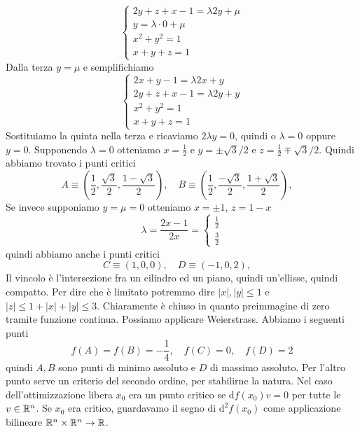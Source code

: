 \documentclass[a4paper]{article}
\begin{document}
\begin{snippetexercise}{}
\[\begin{cases}
            2y + z + x - 1 = \lambda 2y + \mu \\
            y = \lambda \cdot 0 + \mu \\
            x^2 + y^2 = 1 \\
            x + y + z = 1
        \end{cases}
    \]
    Dalla terza \(y=\mu\) e semplifichiamo
    \[
        \begin{cases}
            2x + y - 1 = \lambda 2x + y \\
            2y + z + x - 1 = \lambda 2y + y \\
            x^2 + y^2 = 1 \\
            x + y + z = 1
        \end{cases}
    \]
    Sostituiamo la quinta nella terza e ricaviamo \(2\lambda y = 0\),
    quindi o \(\lambda = 0\) oppure \(y = 0\). Supponendo \(\lambda = 0\)
    otteniamo \(x=\frac12\) e \(y = \pm \sqrt{3} /2\) e \(z = \frac12 \mp \sqrt{3} / 2\).
    Quindi abbiamo trovato i punti critici
    \[
        A \equiv \left(\frac12, \frac{\sqrt{3}}{2}, \frac{1 - \sqrt{3}}{2}\right), \quad
        B \equiv \left(\frac12, \frac{-\sqrt{3}}{2}, \frac{1 + \sqrt{3}}{2}\right), \quad
    \]
    Se invece supponiamo \(y=\mu = 0\) otteniamo \(x = \pm 1\),
    \(z = 1 - x\)
    \[
        \lambda = \frac{2x - 1}{2x} = \begin{cases}
            \frac12  \\
            \frac32
        \end{cases}
    \]
    quindi abbiamo anche i punti critici
     \[
        C \equiv \left(1, 0, 0\right), \quad
        D \equiv \left(-1, 0, 2\right), \quad
    \]
    Il vincolo è l'intersezione fra un cilindro ed un piano, quindi un'ellisse,
    quindi compatto. Per dire che è limitato potremmo dire \(|x|, |y| \leq 1\)
    e \(|z| \leq 1 + |x| + |y| \leq 3\). Chiaramente è chiuso
    in quanto preimmagine di zero tramite funzione continua.
    Possiamo applicare Weierstrass. Abbiamo i seguenti punti
    \[
        f(A) = f(B) = -\frac14, \quad f(C) = 0, \quad f(D) = 2
    \]
    quindi \(A,B\) sono punti di minimo assoluto e \(D\) di massimo assoluto.
    Per l'altro punto serve un criterio del secondo ordine, per stabilirne la natura.
    Nel caso dell'ottimizzazione libera \(x_0\) era un punto critico se
    \(\text{d}f(x_0) v = 0\) per tutte le \(v \in \mathbb{R}^n\).
    Se \(x_0\) era critico, guardavamo il segno di \(\text{d}^2f(x_0)\) come applicazione
    bilineare
    \(\mathbb{R}^n \times \mathbb{R}^n \to \mathbb{R}\).

\end{snippetexercise}
\end{document}

